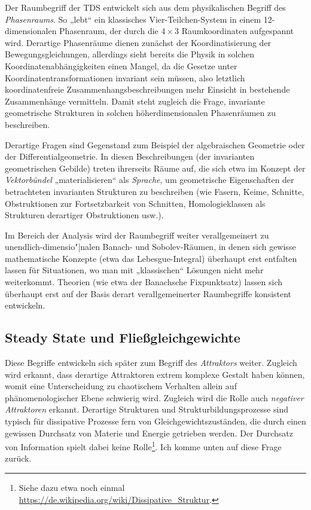 \documentclass[11pt,a4paper]{article}
\begin{document}
Der Raumbegriff der TDS entwickelt sich aus dem physikalischen Begriff des
\emph{Phasenraums}. So „lebt“ ein klassisches Vier-Teilchen-System in einem
12-dimensionalen Phasenraum, der durch die $4\times 3$ Raumkoordinaten
aufgespannt wird. Derartige Phasenräume dienen zunächst der Koordinatisierung
der Bewegungsgleichungen, allerdings sieht bereits die Physik in solchen
Koordinatenabhängigkeiten einen Mangel, da die Gesetze unter
Koordinatentransformationen invariant sein müssen, also letztlich
koordinatenfreie Zusammenhangsbeschreibungen mehr Einsicht in bestehende
Zusammenhänge vermitteln. Damit steht zugleich die Frage, invariante
geometrische Strukturen in solchen höherdimensionalen Phasenräumen zu
beschreiben.

Derartige Fragen sind Gegenstand zum Beispiel der algebraischen Geometrie oder
der Differentialgeometrie. In diesen Beschreibungen (der invarianten
geometrischen Gebilde) treten ihrerseits Räume auf, die sich etwa im Konzept
der \emph{Vektorbündel} „materialisieren“ als \emph{Sprache}, um geometrische
Eigenschaften der betrachteten invarianten Strukturen zu beschreiben (wie
Fasern, Keime, Schnitte, Obstruktionen zur Fortsetzbarkeit von Schnitten,
Homologieklassen als Strukturen derartiger Obstruktionen usw.).

Im Bereich der Analysis wird der Raumbegriff weiter verallgemeinert zu
unendlich-dimensio"|nalen Banach- und Sobolev-Räumen, in denen sich gewisse
mathematische Konzepte (etwa das Lebesgue-Integral) überhaupt erst entfalten
lassen für Situationen, wo man mit „klassischen“ Lösungen nicht mehr
weiterkommt.  Theorien (wie etwa der Banachsche Fixpunktsatz) lassen sich
überhaupt erst auf der Basis derart verallgemeinerter Raumbegriffe konsistent
entwickeln.

\subsection{Steady State und Fließgleichgewichte}

Diese Begriffe entwickeln sich später zum Begriff des \emph{Attraktors}
weiter.  Zugleich wird erkannt, dass derartige Attraktoren extrem komplexe
Gestalt haben können, womit eine Unterscheidung zu chaotischem Verhalten
allein auf phänomenologischer Ebene schwierig wird.  Zugleich wird die Rolle
auch \emph{negativer Attraktoren} erkannt.  Derartige Strukturen und
Strukturbildungsprozesse sind typisch für dissipative Prozesse fern von
Gleichgewichtszuständen, die durch einen gewissen Durchsatz von Materie und
Energie getrieben werden. Der Durchsatz von Information spielt dabei keine
Rolle\footnote{Siehe dazu etwa noch einmal
  \url{https://de.wikipedia.org/wiki/Dissipative_Struktur}.}. Ich komme unten
auf diese Frage zurück.
\end{document}
